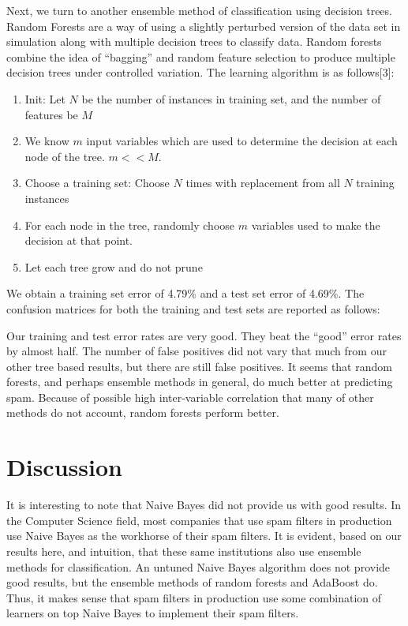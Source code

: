 \documentclass[a4paper,10pt]{article}
\begin{document}
Next, we turn to another ensemble method of classification using decision trees. Random Forests are a way of using a slightly perturbed
version of the data set in simulation along with multiple decision trees to classify data. Random forests combine the idea of
``bagging'' and random feature selection to produce multiple decision trees under controlled variation. The learning algorithm
is as follows[3]:

\begin{enumerate}
  \item Init: Let $N$ be the number of instances in training set, and the number of features be $M$
  \item We know $m$ input variables which are used to determine the decision at each node of the tree. $m << M$.
  \item Choose a training set: Choose $N$ times with replacement from all $N$ training instances
    \item For each node in the tree, randomly choose $m$ variables used to make the decision at that point. 
    \item Let each tree grow and do not prune
\end{enumerate}

We obtain a training set error of 4.79\% and a test set error of 4.69\%. The confusion matrices for both the training and test
sets are reported as follows:

Our training and test error rates are very good. They beat the ``good'' error rates by almost half. The number of false positives
did not vary that much from our other tree based results, but there are still false positives. It seems that random forests, and perhaps
ensemble methods in general, do much better at predicting spam. Because of possible high inter-variable correlation that many of
other methods do not account, random forests perform better.
\section{Discussion}

It is interesting to note that Naive Bayes did not provide us with good results. In the Computer Science field, most companies that
use spam filters in production use Naive Bayes as the workhorse of their spam filters. It is evident, based on our results here, and intuition,
that these same institutions also use ensemble methods for classification. An untuned Naive Bayes algorithm does not provide good results,
but the ensemble methods of random forests and AdaBoost do. Thus, it makes sense that spam filters in production use some combination of
learners on top Naive Bayes to implement their spam filters.
\end{document}
